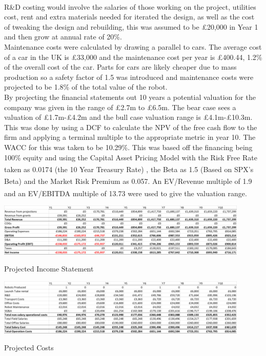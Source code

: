 \documentclass[11pt]{article}		%
\newcommand{\supercite}[1]{\textsuperscript{\cite{#1}}}		%
\begin{document}
			    \\
			    R\&D costing would involve the salaries of those working on the project, utilities cost, rent and extra materials needed for iterated the design, as well as the cost of tweaking the design and rebuilding, this was assumed to be £20,000 in Year 1 and then grow at annual rate of 20\%. 
			    \\
			    Maintenance costs were calculated by drawing a parallel to cars. The average cost of a car in the UK is £33,000 and the maintenance cost per year is £400.44, 1.2\% of the overall cost of the car. Parts for cars are likely cheaper due to mass production so a safety factor of 1.5 was introduced and maintenance costs were projected to be 1.8\% of the total value of the robot.
			    \\
			    By projecting the financial statements out 10 years a potential valuation for the company was given in the range of £2.7m to £6.5m. The bear case sees a valuation of £1.7m-£4.2m and the bull case valuation range is £4.1m-£10.3m.  This was done by using a DCF to calculate the NPV of the free cash flow to the firm and applying a terminal multiple to the appropriate metric in year 10. The WACC for this was taken to be 10.29\%. This was based off the financing being 100\% equity and using the Capital Asset Pricing Model with the Risk Free Rate taken as 0.0174 (the 10 Year Treasury Rate) \supercite{Treasury}, the Beta as 1.5 (Based on SPX's Beta)\supercite{SPX_Beta} and the Market Risk Premium as 0.057\supercite{Risk_Premium}. An EV/Revenue multiple of 1.9 and an EV/EBITDA multiple of 13.73\supercite{Robo} were used to give the valuation range.
			   
			    
			    
			    
		        \begin{table}[H]
					\centering
					\includegraphics[width=0.9\textwidth]{Income_statement_v1}
					\caption{Projected Income Statement}
					\label{forecast_PL}
				\end{table}
		            
		      	\begin{table}[H]
					\centering
					\includegraphics[width=0.9\textwidth]{Costs_v1}
					\caption{Projected Costs}
					\label{forecast_costs}
				\end{table}
				
\end{document}
